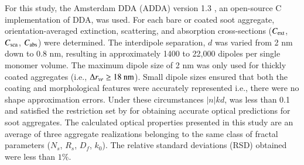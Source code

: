 For this study, the Amsterdam DDA (ADDA) version 1.3 \citep{RN11}, an open-source C implementation of DDA, was used. For each bare or coated soot aggregate, orientation-averaged extinction, scattering, and absorption cross-sections ($C_{\rm ext}$, $C_{\rm sca}$, $C_{\rm abs}$) were determined. The interdipole separation, $d$ was varied from 2 nm down to 0.8 nm, resulting in approximately 1400 to 22,000 dipoles per single monomer volume. The maximum dipole size of 2 nm was only used for thickly coated aggregates (i.e., $\Delta r_{ve}\ge 18\ \rm nm$). Small dipole sizes ensured that both the coating and morphological features were accurately represented i.e., there were no shape approximation errors. Under these circumstances $|n|kd$, was less than 0.1 and satisfied the restriction set by \citet{RN32} for obtaining accurate optical predictions for soot aggregates. The calculated optical properties presented in this study are an average of three aggregate realizations belonging to the same class of fractal parameters ($N_s$, $R_s$, $D_f$, $k_0$). The relative standard deviations (RSD) obtained were less than $1\%$.
